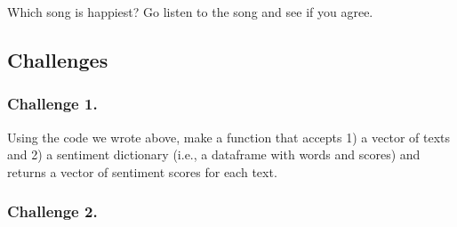 \documentclass[
]{book}
\newenvironment{Shaded}{\begin{snugshade}}{\end{snugshade}}
\newcommand{\CommentTok}[1]{\textcolor[rgb]{0.56,0.35,0.01}{\textit{#1}}}
\newcommand{\ControlFlowTok}[1]{\textcolor[rgb]{0.13,0.29,0.53}{\textbf{#1}}}
\newcommand{\KeywordTok}[1]{\textcolor[rgb]{0.13,0.29,0.53}{\textbf{#1}}}
\newcommand{\NormalTok}[1]{#1}
\newcommand{\OperatorTok}[1]{\textcolor[rgb]{0.81,0.36,0.00}{\textbf{#1}}}
\newcommand{\StringTok}[1]{\textcolor[rgb]{0.31,0.60,0.02}{#1}}
\begin{document}
\begin{Shaded}
\end{Shaded}

Which song is happiest? Go listen to the song and see if you agree.

\hypertarget{challenges-18}{%
\subsection{Challenges}\label{challenges-18}}

\hypertarget{challenge-1.-16}{%
\subsubsection*{Challenge 1.}\label{challenge-1.-16}}

Using the code we wrote above, make a function that accepts 1) a vector of texts and 2) a sentiment dictionary (i.e., a dataframe with words and scores) and returns a vector of sentiment scores for each text.

\begin{Shaded}
\end{Shaded}

\hypertarget{challenge-2.-15}{%
\subsubsection*{Challenge 2.}\label{challenge-2.-15}}
\end{document}
